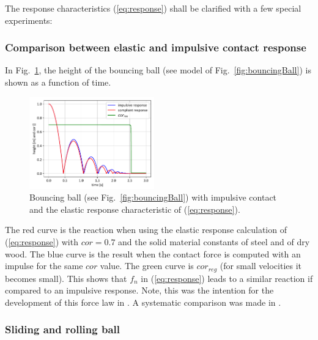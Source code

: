 The response characteristics (\ref{eq:response}) shall be clarified with a few special
experiments:

\subsubsection*{Comparison between elastic and impulsive contact response}

In Fig.~\ref{fig:bouncingBallPlot}, the height of the bouncing ball (see model
of Fig.~\ref{fig:bouncingBall}) is shown as a function of time.
%
\begin{figure}[b]
	\centering
	\includegraphics[width=0.48\textwidth]{figures/bouncingBall_plot.pdf}
	\caption{Bouncing ball (see Fig.~\ref{fig:bouncingBall}) with impulsive contact
             and the elastic response characteristic of (\ref{eq:response}).}
	\label{fig:bouncingBallPlot}
\end{figure}
%
The red curve is the reaction when using the elastic response calculation of 
(\ref{eq:response}) with $cor = 0.7$ and the solid material constants of steel and of
dry wood. The blue curve is the result when
the contact force is computed with an impulse for the same $cor$ value.
The green curve is $cor_{reg}$ (for small velocities it becomes small).
This shows that $f_n$ in (\ref{eq:response}) leads to a similar reaction if
compared to an impulsive response. Note, this was the intention for the development
of this force law in \cite{Flores2011}. A systematic comparison was made in \cite{Skinjar2018}.
 
\subsubsection*{Sliding and rolling ball}

